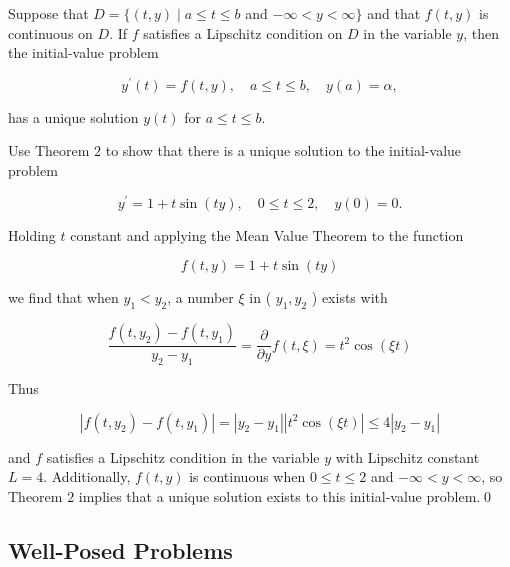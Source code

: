 \begin{theorem}\label{thm:elementarytheofIVPtm2}
Suppose that $D=\{(t, y) \mid a \leq t \leq b$ and $-\infty<y<\infty\}$ and that $f(t, y)$ is continuous on $D$. If $f$ satisfies a Lipschitz condition on $D$ in the variable $y$, then the initial-value problem

$$
y^{\prime}(t)=f(t, y), \quad a \leq t \leq b, \quad y(a)=\alpha,
$$

has a unique solution $y(t)$ for $a \leq t \leq b$.
\end{theorem}

\begin{example}
Use Theorem $2$ to show that there is a unique solution to the initial-value problem

$$
y^{\prime}=1+t \sin (t y), \quad 0 \leq t \leq 2, \quad y(0)=0 .
$$
\end{example}

\begin{mysolution}
Holding $t$ constant and applying the Mean Value Theorem to the function

$$
f(t, y)=1+t \sin (t y)
$$

we find that when $y_{1}<y_{2}$, a number $\xi$ in ( $y_{1}, y_{2}$ ) exists with

$$
\frac{f\left(t, y_{2}\right)-f\left(t, y_{1}\right)}{y_{2}-y_{1}}=\frac{\partial}{\partial y} f(t, \xi)=t^{2} \cos (\xi t)
$$

Thus

$$
\left|f\left(t, y_{2}\right)-f\left(t, y_{1}\right)\right|=\left|y_{2}-y_{1}\right|\left|t^{2} \cos (\xi t)\right| \leq 4\left|y_{2}-y_{1}\right|
$$

and $f$ satisfies a Lipschitz condition in the variable $y$ with Lipschitz constant $L=4$. Additionally, $f(t, y)$ is continuous when $0 \leq t \leq 2$ and $-\infty<y<\infty$, so Theorem $2$ implies that a unique solution exists to this initial-value problem.\qed
\end{mysolution}

%
\subsection*{Well-Posed Problems}

